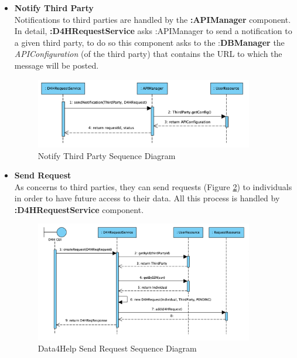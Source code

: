 \documentclass[a4paper, hidelinks, 12pt]{report}
\begin{document}
\begin{itemize}
	\item \textbf{Notify Third Party} \\
	Notifications to third parties are handled by the \textbf{:APIManager} component. In detail, \textbf{:D4HRequestService} asks :APIManager to send a notification to a given third party, to do so this component asks to the :\textbf{DBManager} the \textit{APIConfiguration} (of the third party) that contains the URL to which the message will be posted. \\
	
	\begin{figure}[H]
		\centering
		\includegraphics[width=0.9\textwidth]{diagrams/sequence_diagrams/d4h_notify_third_party.png}
		\caption[Notify Third Party Sequence Diagram]{Notify Third Party Sequence Diagram}
		\label{fig:d4h_seq_ notify_third_party}
	\end{figure}
	
	\item \textbf{Send Request} \\
	As concerns to third parties, they can send requests (Figure \ref{fig:d4h_seq_send_request}) to individuals in order to have future access to their data. All this process is handled by  \\ \textbf{:D4HRequestService} component.  \\
	
	\begin{figure}[H]
		\centering
		\includegraphics[width=0.9\textwidth]{diagrams/sequence_diagrams/d4h_send_request.png}
		\caption[Data4Help Send Request Sequence Diagram]{Data4Help Send Request Sequence Diagram}
		\label{fig:d4h_seq_send_request}
	\end{figure}
	

\end{itemize}
\end{document}

